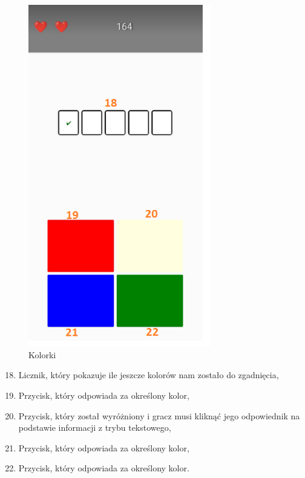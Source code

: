 	\begin{figure}[!htb]
	\begin{center}
		\includegraphics[width=8cm]{rys/opis10.png}
		\caption{Kolorki}
		\label{rys:rysunek001}
	\end{center}
\end{figure}

\begin{enumerate}
	\setcounter{enumi}{17}
	\item Licznik, który pokazuje ile jeszcze kolorów nam zostało do zgadnięcia,
	\item Przycisk, który odpowiada za określony kolor,
	\item Przycisk, który został wyróżniony i gracz musi kliknąć jego odpowiednik na podstawie informacji z trybu tekstowego,
	\item Przycisk, który odpowiada za określony kolor,
	\item Przycisk, który odpowiada za określony kolor.
	\\
	\\
\end{enumerate}

